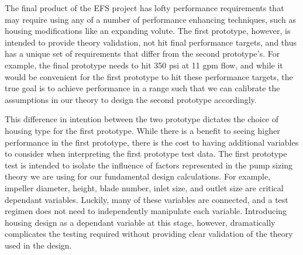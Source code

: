 \documentclass[11pt,twoside,a4paper,openright]{report}
\begin{document}
\newpage
The final product of the EFS project has lofty performance requirements that may require using any of a number of performance enhancing techniques, such as housing modifications like an expanding volute. The first prototype, however, is intended to provide theory validation, not hit final performance targets, and thus has a unique set of requirements that differ from the second prototype’s. For example, the final prototype needs to hit 350 psi at 11 gpm flow, and while it would be convenient for the first prototype to hit these performance targets, the true goal is to achieve performance in a range such that we can calibrate the assumptions in our theory to design the second prototype accordingly. \par
\vspace{12pt}
This difference in intention between the two prototype dictates the choice of housing type for the first prototype. While there is a benefit to seeing higher performance in the first prototype, there is the cost to having additional variables to consider when interpreting the first prototype test data. The first prototype test is intended to isolate the influence of factors represented in the pump sizing theory we are using for our fundamental design calculations. For example, impeller diameter, height, blade number, inlet size, and outlet size are critical dependant variables. Luckily, many of these variables are connected, and a test regimen does not need to independently manipulate each variable. Introducing housing design as a dependant variable at this stage, however, dramatically complicates the testing required without providing clear validation of the theory used in the design.\par
\vspace{12pt}
\end{document}
